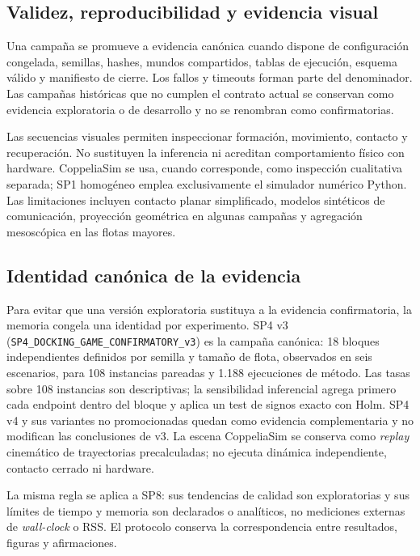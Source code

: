 \subsection{Validez, reproducibilidad y evidencia visual}

Una campaña se promueve a evidencia canónica cuando dispone de configuración congelada, semillas, hashes, mundos compartidos, tablas de ejecución, esquema válido y manifiesto de cierre. Los fallos y timeouts forman parte del denominador. Las campañas históricas que no cumplen el contrato actual se conservan como evidencia exploratoria o de desarrollo y no se renombran como confirmatorias.

Las secuencias visuales permiten inspeccionar formación, movimiento, contacto y recuperación. No sustituyen la inferencia ni acreditan comportamiento físico con hardware. CoppeliaSim se usa, cuando corresponde, como inspección cualitativa separada; SP1 homogéneo emplea exclusivamente el simulador numérico Python. Las limitaciones incluyen contacto planar simplificado, modelos sintéticos de comunicación, proyección geométrica en algunas campañas y agregación mesoscópica en las flotas mayores.

\subsection{Identidad canónica de la evidencia}

Para evitar que una versión exploratoria sustituya a la evidencia confirmatoria, la memoria congela una identidad por experimento. SP4 v3 (\texttt{SP4\_DOCKING\_GAME\_CONFIRMATORY\_v3}) es la campaña canónica: 18 bloques independientes definidos por semilla y tamaño de flota, observados en seis escenarios, para 108 instancias pareadas y 1.188 ejecuciones de método. Las tasas sobre 108 instancias son descriptivas; la sensibilidad inferencial agrega primero cada endpoint dentro del bloque y aplica un test de signos exacto con Holm. SP4 v4 y sus variantes no promocionadas quedan como evidencia complementaria y no modifican las conclusiones de v3. La escena CoppeliaSim se conserva como \emph{replay} cinemático de trayectorias precalculadas; no ejecuta dinámica independiente, contacto cerrado ni hardware.

La misma regla se aplica a SP8: sus tendencias de calidad son exploratorias y sus límites de tiempo y memoria son declarados o analíticos, no mediciones externas de \emph{wall-clock} o RSS. El protocolo conserva la correspondencia entre resultados, figuras y afirmaciones.

